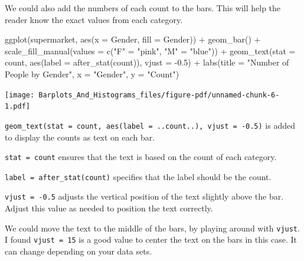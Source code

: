 \documentclass[
  letterpaper,
  DIV=11,
  numbers=noendperiod]{scrreprt}
\newenvironment{Shaded}{\begin{snugshade}}{\end{snugshade}}
\newcommand{\AttributeTok}[1]{\textcolor[rgb]{0.40,0.45,0.13}{#1}}
\newcommand{\FloatTok}[1]{\textcolor[rgb]{0.68,0.00,0.00}{#1}}
\newcommand{\FunctionTok}[1]{\textcolor[rgb]{0.28,0.35,0.67}{#1}}
\newcommand{\NormalTok}[1]{\textcolor[rgb]{0.00,0.23,0.31}{#1}}
\newcommand{\OtherTok}[1]{\textcolor[rgb]{0.00,0.23,0.31}{#1}}
\newcommand{\SpecialCharTok}[1]{\textcolor[rgb]{0.37,0.37,0.37}{#1}}
\newcommand{\StringTok}[1]{\textcolor[rgb]{0.13,0.47,0.30}{#1}}
\begin{document}
We could also add the numbers of each count to the bars. This will help
the reader know the exact values from each category.

\begin{Shaded}
\begin{Highlighting}[]
\FunctionTok{ggplot}\NormalTok{(supermarket, }\FunctionTok{aes}\NormalTok{(}\AttributeTok{x =}\NormalTok{ Gender, }\AttributeTok{fill =}\NormalTok{ Gender)) }\SpecialCharTok{+}
  \FunctionTok{geom\_bar}\NormalTok{() }\SpecialCharTok{+}
  \FunctionTok{scale\_fill\_manual}\NormalTok{(}\AttributeTok{values =} \FunctionTok{c}\NormalTok{(}\StringTok{"F"} \OtherTok{=} \StringTok{"pink"}\NormalTok{, }\StringTok{"M"} \OtherTok{=} \StringTok{"blue"}\NormalTok{)) }\SpecialCharTok{+}
  \FunctionTok{geom\_text}\NormalTok{(}\AttributeTok{stat =} \StringTok{\textquotesingle{}count\textquotesingle{}}\NormalTok{, }\FunctionTok{aes}\NormalTok{(}\AttributeTok{label =} \FunctionTok{after\_stat}\NormalTok{(count)), }\AttributeTok{vjust =} \SpecialCharTok{{-}}\FloatTok{0.5}\NormalTok{) }\SpecialCharTok{+}
  \FunctionTok{labs}\NormalTok{(}\AttributeTok{title =} \StringTok{"Number of People by Gender"}\NormalTok{,}
       \AttributeTok{x =} \StringTok{"Gender"}\NormalTok{,}
       \AttributeTok{y =} \StringTok{"Count"}\NormalTok{)}
\end{Highlighting}
\end{Shaded}

\texttt{[image: Barplots\_And\_Histograms\_files/figure-pdf/unnamed-chunk-6-1.pdf]}

\texttt{geom\_text(stat\ =\ \textquotesingle{}count\textquotesingle{},\ aes(label\ =\ ..count..),\ vjust\ =\ -0.5)}
is added to display the counts as text on each bar.

\texttt{stat\ =\ \textquotesingle{}count\textquotesingle{}} ensures that
the text is based on the count of each category.

\texttt{label\ =\ after\_stat(count)} specifies that the label should be
the count.

\texttt{vjust\ =\ -0.5} adjusts the vertical position of the text
slightly above the bar. Adjust this value as needed to position the text
correctly.

We could move the text to the middle of the bars, by playing around with
\texttt{vjust}. I found \texttt{vjust\ =\ 15} is a good value to center
the text on the bars in this case. It can change depending on your data
sets.
\end{document}
